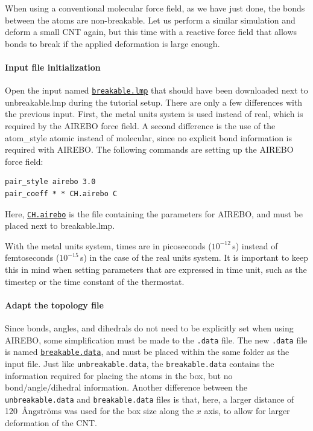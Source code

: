 \documentclass[9pt,tutorial]{livecoms}
\newcommand{\lmpcmd}[1]{\hspace{0pt}\colorbox{listing}{\textcolor{command}{\small{#1}}}\hspace{0pt}} %
\newcommand{\lmpcmdnote}[1]{\hspace{0pt}\colorbox{note_listing}{\textcolor{command}{\small{#1}}}\hspace{0pt}} %
\newcommand{\flecmd}[1]{\textcolor{command}{\texttt{#1}}} %
\newcommand{\dwlcmd}[1]{\textcolor{download}{\texttt{#1}}} %
\newcommand{\filepath}{https://raw.githubusercontent.com/lammpstutorials/lammpstutorials-article/main/files/}
\begin{document}
When using a conventional molecular force field, as we have just done, the bonds between the atoms
are non-breakable.  Let us perform a similar simulation and deform a small
CNT again, but this time with a reactive force field that allows bonds
to break if the applied deformation is large enough.

\paragraph{Input file initialization}

Open the input named
\href{\filepath tutorial2/breakable.lmp}{\dwlcmd{breakable.lmp}} that should have
been downloaded next to \lmpcmd{unbreakable.lmp} during the tutorial setup.
There are only a few differences with the previous input.  First, the \lmpcmd{metal}
units system is used instead of \lmpcmd{real}, which is
required by the AIREBO force field.  A second difference is the use of the
\lmpcmd{atom\_style atomic} instead of \lmpcmd{molecular}, since no explicit
bond information is required with AIREBO.  The following commands are
setting up the AIREBO force field:
\begin{lstlisting}
pair_style airebo 3.0
pair_coeff * * CH.airebo C
\end{lstlisting}
Here, \href{\filepath tutorial2/CH.airebo}{\dwlcmd{CH.airebo}} is the file
containing the parameters for AIREBO, and must be placed next
to \lmpcmd{breakable.lmp}.

\begin{note}
  With the \lmpcmdnote{metal} units system, times are in picoseconds ($10^{-12}$\,s)
  instead of femtoseconds ($10^{-15}$\,s) in the case of the \lmpcmdnote{real} units system.
  It is important to keep this in mind when setting parameters that are expressed
  in time unit, such as the timestep or the time constant of the thermostat.
\end{note}

\paragraph{Adapt the topology file}

Since bonds, angles, and dihedrals do not need to be
explicitly set when using AIREBO, some simplification must be made to the
\flecmd{.data} file.  The new \flecmd{.data}
file is named \href{\filepath tutorial2/breakable.data}{\dwlcmd{breakable.data}},
and must be placed within the same folder as the input file.  Just like \flecmd{unbreakable.data},
the \flecmd{breakable.data} contains the information
required for placing the atoms in the box, but no bond/angle/dihedral information.
Another difference between the \flecmd{unbreakable.data} and \flecmd{breakable.data} files
is that, here, a larger distance of 120~Ångströms was used for the box size along
the $x$ axis, to allow for larger deformation of the CNT.
\end{document}
